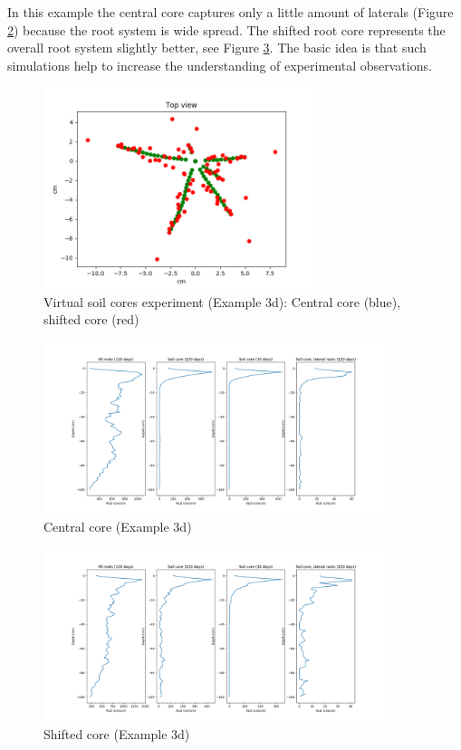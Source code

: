 \documentclass[a4paper]{article}
\begin{document}
In this example the central core captures only a little amount of laterals (Figure \ref{fig:central}) because the root system is wide spread. 
The shifted root core represents the overall root system slightly better, see Figure \ref{fig:shifted}.  
The basic idea is that such simulations help to increase the understanding of experimental observations.

\begin{figure}
\centering
\includegraphics[width=0.7\textwidth]{example_3d.png} %
\caption{Virtual soil cores experiment (Example 3d): Central core (blue), shifted core (red)} \label{fig:soilcoreGeom}
\end{figure} 

\begin{figure}
\centering
\includegraphics[width=0.9\textwidth]{example_3d1.png} 
\caption{Central core (Example 3d)} \label{fig:central}
\end{figure}

\begin{figure}
\centering
\includegraphics[width=0.9\textwidth]{example_3d2.png} 
\caption{Shifted core (Example 3d)} \label{fig:shifted}
\end{figure}
\end{document}
